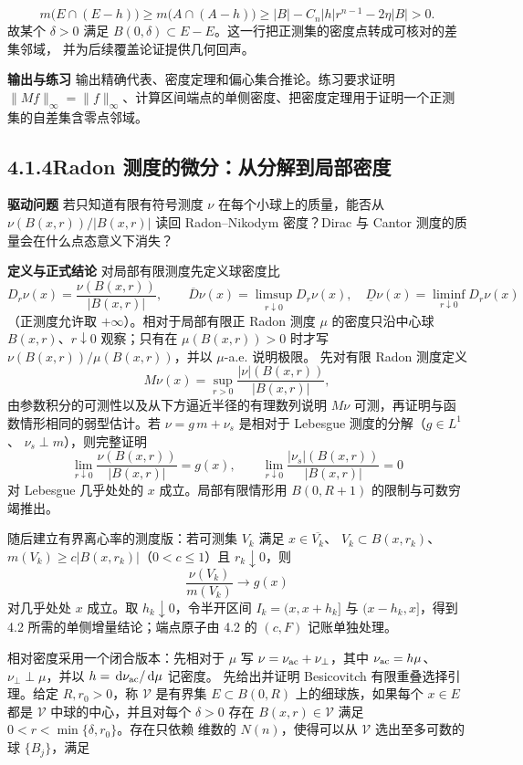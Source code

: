 \documentclass[11pt,a4paper]{ctexart}
\newcommand{\dd}{\,\mathrm d}
\newcommand{\planitem}[1]{\par\smallskip\noindent\textcolor{deepblue}{\textbf{#1}}\quad}
\newcommand{\unithead}[2]{\subsection{#1\quad #2}}
\begin{document}
\[
m\bigl(E\cap(E-h)\bigr)
\ge m\bigl(A\cap(A-h)\bigr)
\ge |B|-C_n|h|r^{n-1}-2\eta|B|>0.
\]
故某个 $\delta>0$ 满足 $B(0,\delta)\subset E-E$。这一行把正测集的密度点转成可核对的差集邻域，
并为后续覆盖论证提供几何回声。

\planitem{输出与练习}
输出精确代表、密度定理和偏心集合推论。练习要求证明 $\|Mf\|_\infty=\|f\|_\infty$、计算区间端点的单侧密度、把密度定理用于证明一个正测集的自差集含零点邻域。

\unithead{4.1.4}{Radon 测度的微分：从分解到局部密度}

\planitem{驱动问题}
若只知道有限有符号测度 $\nu$ 在每个小球上的质量，能否从
$\nu(B(x,r))/|B(x,r)|$ 读回 Radon--Nikodym 密度？Dirac 与 Cantor 测度的质量会在什么点态意义下消失？

\planitem{定义与正式结论}
对局部有限测度先定义球密度比
\[
D_r\nu(x)=\frac{\nu(B(x,r))}{|B(x,r)|},\qquad
\overline D\nu(x)=\limsup_{r\downarrow0}D_r\nu(x),\quad
\underline D\nu(x)=\liminf_{r\downarrow0}D_r\nu(x)
\]
（正测度允许取 $+\infty$）。相对于局部有限正 Radon 测度 $\mu$ 的密度只沿中心球
$B(x,r)$、$r\downarrow0$ 观察；只有在 $\mu(B(x,r))>0$ 时才写
$\nu(B(x,r))/\mu(B(x,r))$，并以 $\mu$-a.e. 说明极限。
先对有限 Radon 测度定义
\[
M\nu(x)=\sup_{r>0}\frac{|\nu|(B(x,r))}{|B(x,r)|},
\]
由参数积分的可测性以及从下方逼近半径的有理数列说明 $M\nu$ 可测，再证明与函数情形相同的弱型估计。若
$\nu=g\,m+\nu_s$ 是相对于 Lebesgue 测度的分解（$g\in L^1$、
$\nu_s\perp m$），则完整证明
\[
\lim_{r\downarrow0}\frac{\nu(B(x,r))}{|B(x,r)|}=g(x),
\qquad
\lim_{r\downarrow0}\frac{|\nu_s|(B(x,r))}{|B(x,r)|}=0
\]
对 Lebesgue 几乎处处的 $x$ 成立。局部有限情形用 $B(0,R+1)$ 的限制与可数穷竭推出。

随后建立有界离心率的测度版：若可测集 $V_k$ 满足 $x\in\overline{V_k}$、
$V_k\subset B(x,r_k)$、
$m(V_k)\ge c|B(x,r_k)|$（$0<c\le1$）且 $r_k\downarrow0$，则
\[
\frac{\nu(V_k)}{m(V_k)}\longrightarrow g(x)
\]
对几乎处处 $x$ 成立。取 $h_k\downarrow0$，令半开区间
$I_k=(x,x+h_k]$ 与 $(x-h_k,x]$，得到 4.2 所需的单侧增量结论；端点原子由 4.2 的
$(c,F)$ 记账单独处理。

相对密度采用一个闭合版本：先相对于 $\mu$ 写
$\nu=\nu_{\rm ac}+\nu_\perp$，其中 $\nu_{\rm ac}=h\mu$、
$\nu_\perp\perp\mu$，并以 $h=\dd\nu_{\rm ac}/\dd\mu$ 记密度。
先给出并证明 Besicovitch 有限重叠选择引理。给定 $R,r_0>0$，称
$\mathcal V$ 是有界集 $E\subset B(0,R)$ 上的细球族，如果每个
$x\in E$ 都是 $\mathcal V$ 中球的中心，并且对每个 $\delta>0$ 存在
$B(x,r)\in\mathcal V$ 满足 $0<r<\min\{\delta,r_0\}$。存在只依赖
维数的 $N(n)$，使得可以从 $\mathcal V$ 选出至多可数的球 $\{B_j\}$，满足
\end{document}
